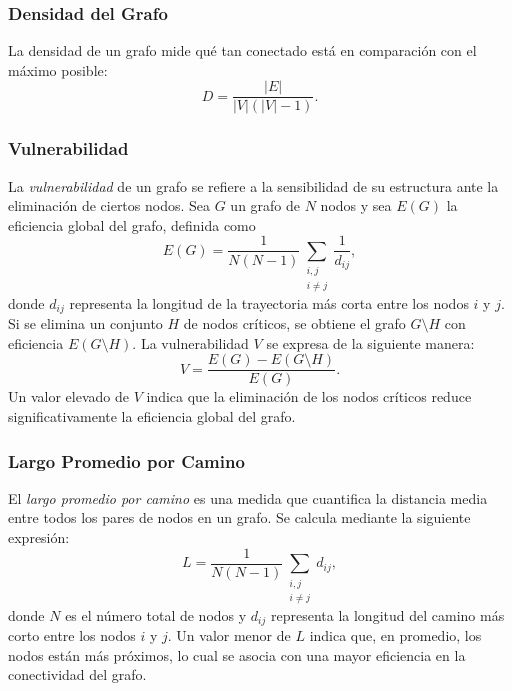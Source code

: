 \documentclass[openany]{book}
\begin{document}
			\subsubsection{Densidad del Grafo}
			La densidad de un grafo mide qué tan conectado está en comparación con el máximo posible:
			\begin{equation}
				D = \frac{|E|}{|V|(|V|-1)}.
			\end{equation}

			\subsubsection{Vulnerabilidad}
			La \emph{vulnerabilidad} de un grafo se refiere a la sensibilidad de su estructura ante la eliminación de ciertos nodos.
			Sea $G$ un grafo de $N$ nodos y sea $E(G)$ la eficiencia global del grafo, definida como
			\begin{equation}
				E(G) = \frac{1}{N(N-1)} \sum_{\substack{i,j \\ i \neq j}} \frac{1}{d_{ij}},
			\end{equation}
			donde $d_{ij}$ representa la longitud de la trayectoria más corta entre los nodos $i$ y $j$. Si se elimina un conjunto $H$ de nodos críticos, se obtiene el grafo $G \setminus H$ con eficiencia $E(G \setminus H)$.
			La vulnerabilidad $V$ se expresa de la siguiente manera:
			\begin{equation}
			V = \frac{E(G) - E(G \setminus H)}{E(G)}.
			\end{equation}
			Un valor elevado de $V$ indica que la eliminación de los nodos críticos reduce significativamente la eficiencia global del grafo.

			\subsubsection{Largo Promedio por Camino}
			El \emph{largo promedio por camino} es una medida que cuantifica la distancia media entre todos los pares de nodos en un grafo. Se calcula mediante la siguiente expresión:
			\begin{equation}
				L = \frac{1}{N(N-1)} \sum_{\substack{i,j \\ i \neq j}} d_{ij},
			\end{equation}
			donde $N$ es el número total de nodos y $d_{ij}$ representa la longitud del camino más corto entre los nodos $i$ y $j$. Un valor menor de $L$ indica que, en promedio, los nodos están más próximos, lo cual se asocia con una mayor eficiencia en la conectividad del grafo.
\end{document}
